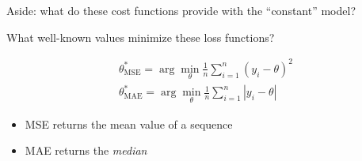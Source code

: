 \documentclass[aspectratio=169]{beamer}
\begin{document}
\begin{frame}{Aside: what do these cost functions provide with the ``constant'' model?}

What well-known values minimize these loss functions?

	\begin{align*}
		\theta^*_{\text{MSE}} = \arg \min_\theta  \frac{1}{n}\sum_{i=1}^n (y_i - \theta)^2\\
		\theta^*_{\text{MAE}} = \arg \min_\theta  \frac{1}{n}\sum_{i=1}^n |y_i - \theta|
	\end{align*}
\pause
\begin{itemize}
	\item MSE returns the mean value of a sequence
	\item MAE returns the \textit{median}
\end{itemize}

\end{frame}
\end{document}

